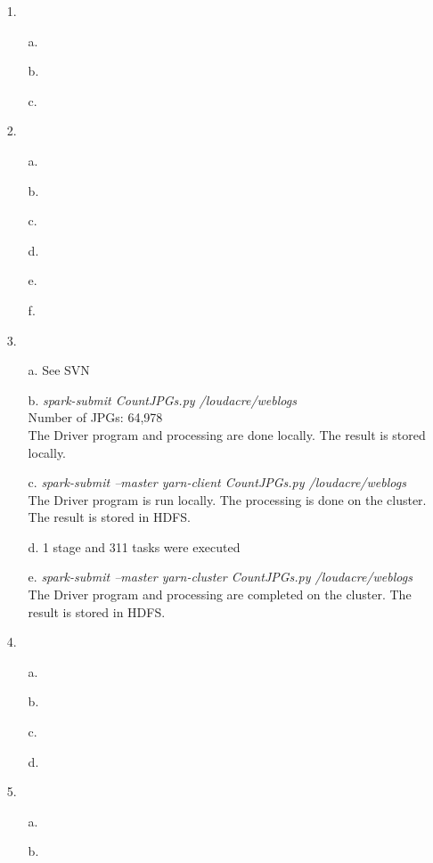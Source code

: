 \documentclass{article}
\begin{document}
\begin{itemize}

\item[1.] 
	\begin{itemize}
		\item[a.]
		\item[b.]
		\item[c.]
	\end{itemize}

\pagebreak
\setlength{\headsep}{5pt}
\item[2.]
	\begin{itemize}
		\item[a.]
		\item[b.]
		\item[c.]
		\item[d.]
		\item[e.]
		\item[f.]
	\end{itemize}
	
\pagebreak
\setlength{\headsep}{5pt}
\item[3.]
	\begin{itemize}
		\item[a.] See SVN
		\item[b.] \textit{spark-submit CountJPGs.py /loudacre/weblogs}\\
		Number of JPGs: 64,978\\
		The Driver program and processing are done locally. The result is stored locally.
		\item[c.] \textit{spark-submit --master yarn-client CountJPGs.py /loudacre/weblogs}\\
		The Driver program is run locally. The processing is done on the cluster. The result is stored in HDFS.
		\item[d.] 1 stage and 311 tasks were executed
		\item[e.] \textit{spark-submit --master yarn-cluster CountJPGs.py /loudacre/weblogs}\\
		The Driver program and processing are completed on the cluster. The result is stored in HDFS.
	\end{itemize}
	
\pagebreak
\setlength{\headsep}{5pt}
\item[4.]
	\begin{itemize}
		\item[a.]
		\item[b.]
		\item[c.]
		\item[d.]
	\end{itemize}

\pagebreak
\setlength{\headsep}{5pt}
\item[5.]
	\begin{itemize}
		\item[a.]
		\item[b.]
	\end{itemize}

\end{itemize}
\end{document}
